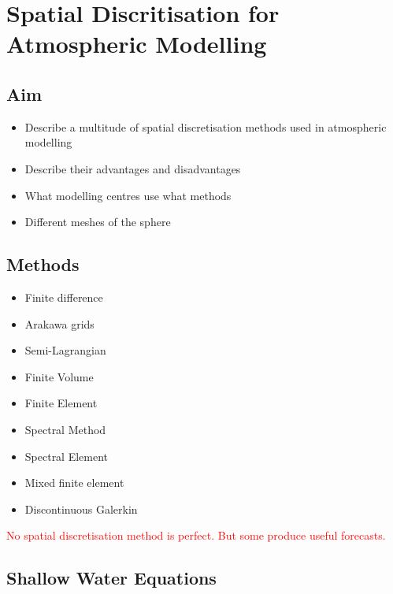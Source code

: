 
\chapter{Spatial Discritisation for Atmospheric Modelling}

\section*{Aim}
\begin{itemize}
\item Describe a multitude of spatial discretisation methods used in atmospheric
modelling
\item Describe their advantages and disadvantages
\item What modelling centres use what methods
\item Different meshes of the sphere
\end{itemize}

\section*{Methods}

\begin{multicols}{2}
\begin{itemize}
\item Finite difference
\item Arakawa grids 
\item Semi-Lagrangian
\item Finite Volume
\item Finite Element
\item Spectral Method
\item Spectral Element
\item Mixed finite element
\item Discontinuous Galerkin
\end{itemize}
\end{multicols}

\textcolor{red}{No spatial discretisation method is perfect. But some
produce useful forecasts.}

\clearpage{}

\section*{Shallow Water Equations}

